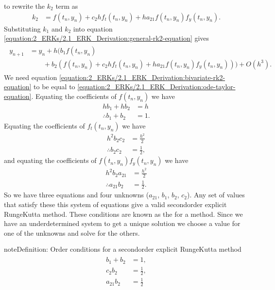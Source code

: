 \documentclass[letterpaper,10pt,english]{jupyterBook}
\begin{document}
\sphinxAtStartPar
to rewrite the \(k_2\) term as
\begin{align*}
    k_2 &= f(t_n, y_n) + c_2 h f_t(t_n, y_n) + h a_{21} f(t_n, y_n) f_y(t_n, y_n).
\end{align*}
\sphinxAtStartPar
Substituting \(k_1\) and \(k_2\) into equation \eqref{equation:2_ERKs/2.1_ERK_Derivation:general-rk2-equation} gives
\begin{equation}\label{equation:2_ERKs/2.1_ERK_Derivation:bivariate-rk2-equation}
\begin{split}\begin{align*}
y_{n+1} &= y_n + h (b_1 f(t_n, y_n) \\
& \qquad + b_2 (f(t_n, y_n) + c_2 h f_t(t_n, y_n) + h a_{21} f(t_n, y_n) f_y(t_n, y_n))) + O(h^3).
\end{align*}\end{split}
\end{equation}
\sphinxAtStartPar
We need equation \eqref{equation:2_ERKs/2.1_ERK_Derivation:bivariate-rk2-equation} to be equal to \eqref{equation:2_ERKs/2.1_ERK_Derivation:ode-taylor-equation}. Equating the coefficients of \(f(t_n, y_n)\) we have
\begin{align*}
    h b_1 + h b_2 &= h \\
    \therefore b_1 + b_2 &= 1.
\end{align*}
\sphinxAtStartPar
Equating the coefficients of \(f_t(t_n, y_n)\) we have
\begin{align*}
    h^2 b_2 c_2 &= \frac{h^2}{2}\\
    \therefore b_2c_2 &= \frac{1}{2},
\end{align*}
\sphinxAtStartPar
and equating the coefficients of \(f(t_n, y_n) f_y(t_n, y_n)\) we have
\begin{align*}
    h^2 b_2 a_{21} &= \frac{h^2}{2} \\
    \therefore a_{21}b_2 &= \frac{1}{2}.
\end{align*}
\sphinxAtStartPar
So we have three equations and four unknowns (\(a_{21}\), \(b_1\), \(b_2\), \(c_2\)). Any set of values that satisfy these this system of equations give a valid second\sphinxhyphen{}order explicit Runge\sphinxhyphen{}Kutta method. These conditions are known as the  for a method. Since we have an underdetermined system to get a unique solution we choose a value for one of the unknowns and solve for the others.

\begin{sphinxadmonition}{note}{Definition: Order conditions for a second\sphinxhyphen{}order explicit Runge\sphinxhyphen{}Kutta method}
\begin{equation}\label{equation:2_ERKs/2.1_ERK_Derivation:rk2-order-conditions-equation}
\begin{split}\begin{align*}
    b_1 +b_2 &=1,\\
    c_2 b_2 &=\frac{1}{2},\\
    a_{21} b_2 &=\frac{1}{2}
\end{align*}\end{split}
\end{equation}\end{sphinxadmonition}
\end{document}
